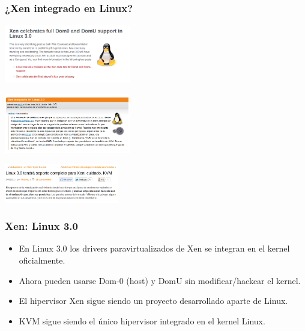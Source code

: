 \documentclass{beamer}
\begin{document}
\begin{frame}
\frametitle{¿Xen integrado en Linux?}

\vspace{-0.25cm}
\begin{center}
\includegraphics[width=5.5cm]{figs/xen-kernel-support.png} \\
\end{center}

\begin{flushright}
\includegraphics[width=5.5cm]{figs/xen-kernel-support3.png} \\
\end{flushright}

\begin{center}
\includegraphics[width=5cm]{figs/xen-kernel-support2.png} 
\end{center}

\end{frame}



\begin{frame}
\frametitle{Xen: Linux 3.0}
\begin{itemize}

\item En Linux 3.0 los \alert{drivers paravirtualizados de Xen} se integran en el kernel oficialmente.
\item Ahora pueden usarse Dom-0 (host) y DomU sin modificar/hackear el kernel.
\item El hipervisor Xen sigue siendo un proyecto desarrollado aparte de Linux.
\item KVM sigue siendo el único hipervisor integrado en el kernel Linux.
\end{itemize}

\end{frame}
\end{document}
